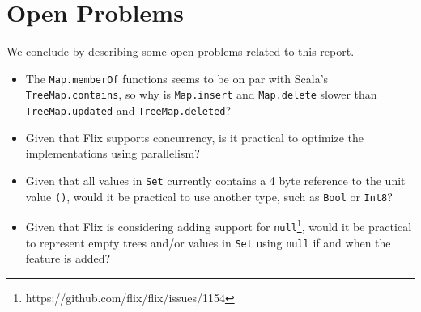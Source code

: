 \documentclass[../main.tex]{subfiles}
\begin{document}
\section{Open Problems}

We conclude by describing some open problems related to this report.

\begin{itemize}
\item The \lstinline{Map.memberOf} functions seems to be on par with Scala's \lstinline{TreeMap.contains}, so why is \lstinline{Map.insert} and \lstinline{Map.delete} slower than \lstinline{TreeMap.updated} and \lstinline{TreeMap.deleted}?
\item Given that Flix supports concurrency, is it practical to optimize the implementations using parallelism?
\item Given that all values in \lstinline{Set} currently contains a 4 byte reference to the unit value \lstinline{()}, would it be practical to use another type, such as \lstinline{Bool} or \lstinline{Int8}?
\item Given that Flix is considering adding support for \lstinline{null}\footnote{https://github.com/flix/flix/issues/1154}, would it be practical to represent empty trees and/or values in \lstinline{Set} using \lstinline{null} if and when the feature is added?
\end{itemize}
\end{document}
